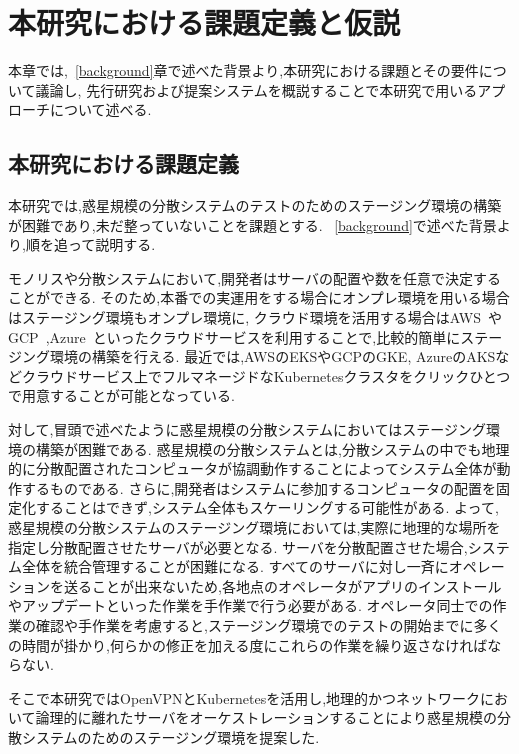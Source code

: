 \chapter{本研究における課題定義と仮説}
\label{issue}

本章では,~\ref{background}章で述べた背景より,本研究における課題とその要件について議論し,
先行研究および提案システムを概説することで本研究で用いるアプローチについて述べる.

\section{本研究における課題定義}
\label{issue:definition}

本研究では,惑星規模の分散システムのテストのためのステージング環境の構築が困難であり,未だ整っていないことを課題とする.
~\ref{background}で述べた背景より,順を追って説明する.

モノリスや分散システムにおいて,開発者はサーバの配置や数を任意で決定することができる.
そのため,本番での実運用をする場合にオンプレ環境を用いる場合はステージング環境もオンプレ環境に,
クラウド環境を活用する場合はAWS~\cite{AWS}やGCP~\cite{GCP},Azure~\cite{Azure}といったクラウドサービスを利用することで,比較的簡単にステージング環境の構築を行える.
最近では,AWSのEKSやGCPのGKE, AzureのAKSなどクラウドサービス上でフルマネージドなKubernetesクラスタをクリックひとつで用意することが可能となっている.

対して,冒頭で述べたように惑星規模の分散システムにおいてはステージング環境の構築が困難である.
惑星規模の分散システムとは,分散システムの中でも地理的に分散配置されたコンピュータが協調動作することによってシステム全体が動作するものである.
さらに,開発者はシステムに参加するコンピュータの配置を固定化することはできず,システム全体もスケーリングする可能性がある.
よって,惑星規模の分散システムのステージング環境においては,実際に地理的な場所を指定し分散配置させたサーバが必要となる.
サーバを分散配置させた場合,システム全体を統合管理することが困難になる.
すべてのサーバに対し一斉にオペレーションを送ることが出来ないため,各地点のオペレータがアプリのインストールやアップデートといった作業を手作業で行う必要がある.
オペレータ同士での作業の確認や手作業を考慮すると,ステージング環境でのテストの開始までに多くの時間が掛かり,何らかの修正を加える度にこれらの作業を繰り返さなければならない.

そこで本研究ではOpenVPNとKubernetesを活用し,地理的かつネットワークにおいて論理的に離れたサーバをオーケストレーションすることにより惑星規模の分散システムのためのステージング環境を提案した.

